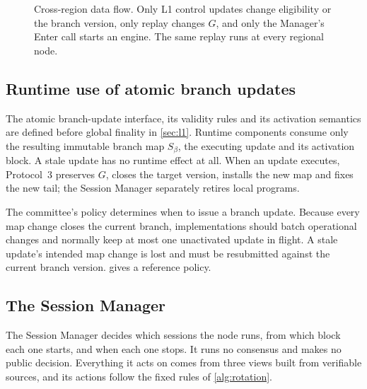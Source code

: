 \documentclass[11pt,a4paper]{article}
\begin{document}
\begin{figure}[p]\centering

\caption{Cross-region data flow. Only L1 control updates change
eligibility or the branch version, only replay changes $G$, and only the
Manager's Enter call starts an engine. The same replay runs at every
regional node.}
\label{fig:runtime-modules}
\end{figure}
\FloatBarrier

\subsection{Runtime use of atomic branch updates}
The atomic branch-update interface, its validity rules and its activation
semantics are defined before global finality in \cref{sec:l1}.  Runtime
components consume only the resulting immutable branch map $S_\beta$,
the executing update and its activation block.  A stale update has no
runtime effect at all.  When an update executes, Protocol~3 preserves
$G$, closes the target version, installs the new map and fixes the new
tail; the Session Manager separately retires local programs.

The committee's policy determines when to issue a branch update.
Because every map change closes the current branch, implementations
should batch operational changes and normally keep at most one
unactivated update in flight.  A stale update's intended map change is
lost and must be resubmitted against the current branch version.
 gives a reference policy.

\subsection{The Session Manager}
\label{sec:session-manager}
The Session Manager decides which sessions the node runs, from which
block each one starts, and when each one stops. It runs no consensus and
makes no public decision. Everything it acts on comes from three views
built from verifiable sources, and its actions follow the fixed rules of
\cref{alg:rotation}.
\end{document}

